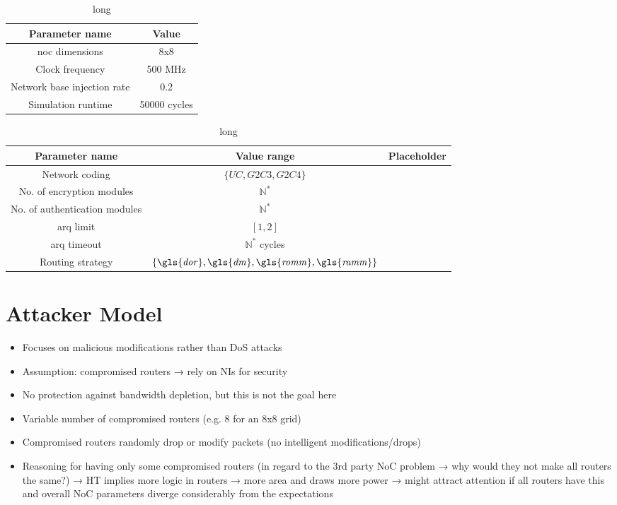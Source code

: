 \begin{table}
    \centering
    \begin{tabulary}{\textwidth}{C|C}
        Parameter name & Value \\\hline
        \Gls{noc} dimensions & 8x8 \\
        Clock frequency & 500 MHz \\
        Network base injection rate & 0.2 \\
        Simulation runtime & \num{50000} cycles \\
    \end{tabulary}
    \caption[short]{long}
    \label{tab:fixedparams}
\end{table}

\begin{table}
    \centering
    \begin{tabulary}{\textwidth}{C|C|C}
        Parameter name & Value range & Placeholder \\\hline
        Network coding & $\{\mathit{UC}, \mathit{G2C3}, \mathit{G2C4}\}$ & \pNCMode{} \\
        No. of encryption modules & $\mathbb{N}^*$ & \pEncMods{} \\
        No. of authentication modules & $\mathbb{N}^*$ & \pAuthMods{} \\
        \Gls{arq} limit & $[1, 2]$ & \pARQLimit{} \\
        \Gls{arq} timeout & $\mathbb{N}^*$ cycles & \pARQTimeout{} \\
        Routing strategy & $\{\mathit{\gls{dor}}, \mathit{\gls{dm}}, \mathit{\gls{romm}}, \mathit{\gls{ramm}}\}$ & \pRStrat{} \\
    \end{tabulary}
    \caption[short]{long}
    \label{tab:inputparams}
\end{table}%

\section{Attacker Model}
\begin{itemize}
    \item Focuses on malicious modifications rather than DoS attacks
    \item Assumption: compromised routers → rely on NIs for security
    \item No protection against bandwidth depletion, but this is not the goal here
    \item Variable number of compromised routers (e.g. 8 for an 8x8 grid)
    \item Compromised routers randomly drop or modify packets (no intelligent modifications/drops)
    \item Reasoning for having only some compromised routers (in regard to the 3rd party NoC problem → why would they not make all routers the same?)
        → HT implies more logic in routers → more area and draws more power → might attract attention if all routers have this and overall NoC
        parameters diverge considerably from the expectations
\end{itemize}

